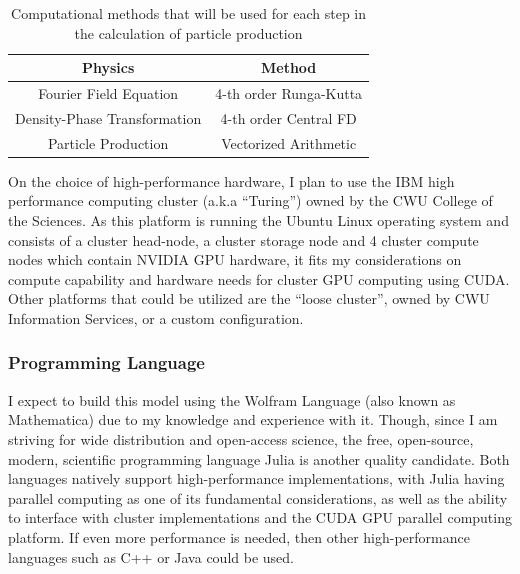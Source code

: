 \documentclass{article}
\begin{document}
                \begin{table}[h]
                    \centering
                    \begin{tabular}{c|c}
                        Physics & Method \\
                        \hline
                        Fourier Field Equation & 4-th order Runga-Kutta \\
                        \hline
                        Density-Phase Transformation & 4-th order Central FD \\
                        \hline
                        Particle Production & Vectorized Arithmetic
                    \end{tabular}
                    \caption{Computational methods that will be used for each step in the calculation of particle production}
                    \label{tab:methods}
                \end{table}
    
                On the choice of high-performance hardware, I plan to use the IBM high performance computing cluster (a.k.a ``Turing'') owned by the CWU College of the Sciences.  As this platform is running the Ubuntu Linux operating system and consists of a cluster head-node, a cluster storage node and 4 cluster compute nodes which contain NVIDIA GPU hardware, it fits my considerations on compute capability and hardware needs for cluster GPU computing using CUDA.  Other platforms that could be utilized are the ``loose cluster'', owned by CWU Information Services, or a custom configuration.

            \subsubsection{Programming Language}

                I expect to build this model using the Wolfram Language (also known as Mathematica) due to my knowledge and experience with it.  Though, since I am striving for wide distribution and open-access science, the free, open-source, modern, scientific programming language Julia is another quality candidate.  Both languages natively support high-performance implementations, with Julia having parallel computing as one of its fundamental considerations, as well as the ability to interface with cluster implementations and the CUDA GPU parallel computing platform.  If even more performance is needed, then other high-performance languages such as C++ or Java could be used.
    
\end{document}

